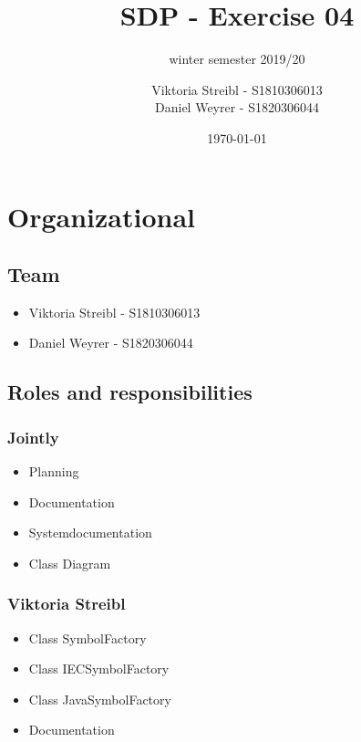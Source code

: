 

\graphicspath{{./}}



\title{SDP - Exercise 04} %
\subtitle{winter semester 2019/20} %
\author{
Viktoria Streibl - S1810306013\\
  Daniel Weyrer - S1820306044
} %
\date{\today} %

\maketitle %

\newpage
\tableofcontents %
\newpage


\section{Organizational}
\subsection{Team}
\begin{itemize}
	\item Viktoria 	Streibl 		- 	S1810306013
	\item Daniel 	Weyrer		-	S1820306044
\end{itemize}

\subsection{Roles and responsibilities}
\subsubsection{Jointly}
\begin{itemize}
	\item Planning
	\item Documentation
	\item Systemdocumentation
	\item Class Diagram
\end{itemize}

\subsubsection{Viktoria Streibl}
\begin{itemize}
	\item Class SymbolFactory
	\item Class IECSymbolFactory
	\item Class JavaSymbolFactory
	\item Documentation	
\end{itemize}

